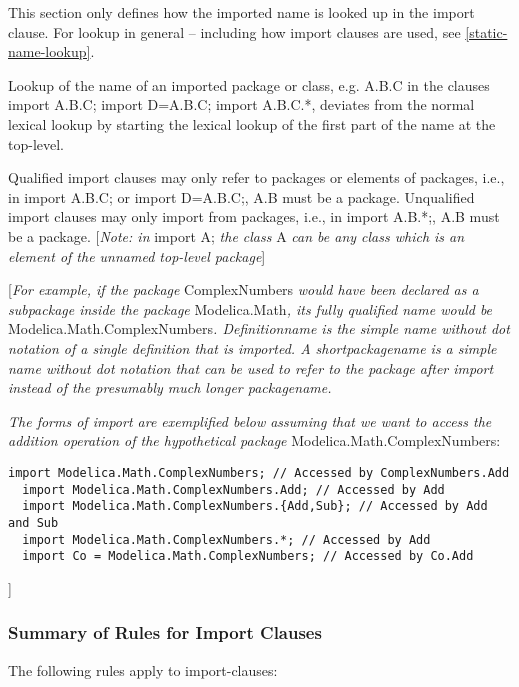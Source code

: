 \documentclass[../MLS.tex]{subfiles}
\begin{document}
This section only defines how the imported name is looked up in the
import clause. For lookup in general -- including how import clauses are
used, see \autoref{static-name-lookup}.

Lookup of the name of an imported package or class, e.g. A.B.C in the
clauses import A.B.C; import D=A.B.C; import A.B.C.*, deviates from the
normal lexical lookup by starting the lexical lookup of the first part
of the name at the top-level.

Qualified import clauses may only refer to packages or elements of
packages, i.e., in import A.B.C; or import D=A.B.C;, A.B must be a
package. Unqualified import clauses may only import from packages, i.e.,
in import A.B.*;, A.B must be a package. {[}\emph{Note: in} import A;
\emph{the class} A \emph{can be any class which is an element of the
unnamed top-level package}{]}

{[}\emph{For example, if the package} ComplexNumbers \emph{would have
been declared as a subpackage inside the package} Modelica.Math\emph{,
its fully qualified name would be} Modelica.Math.ComplexNumbers\emph{.
Definitionname is the simple name without dot notation of a single
definition that is imported. A shortpackagename is a simple name without
dot notation that can be used to refer to the package after import
instead of the presumably much longer packagename.}

\emph{The forms of import are exemplified below assuming that we want to
access the addition operation of the hypothetical package}
Modelica.Math.ComplexNumbers:

\begin{lstlisting}[language=modelica]
  import Modelica.Math.ComplexNumbers; // Accessed by ComplexNumbers.Add
  import Modelica.Math.ComplexNumbers.Add; // Accessed by Add
  import Modelica.Math.ComplexNumbers.{Add,Sub}; // Accessed by Add and Sub
  import Modelica.Math.ComplexNumbers.*; // Accessed by Add
  import Co = Modelica.Math.ComplexNumbers; // Accessed by Co.Add
\end{lstlisting}
{]}

\subsubsection{Summary of Rules for Import Clauses}

The following rules apply to import-clauses:
\end{document}
